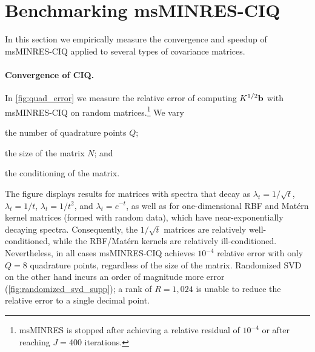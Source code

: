 
\section{Benchmarking msMINRES-CIQ}
\label{sec:ciq_empirical}

In this section we empirically measure the convergence and speedup of msMINRES-CIQ applied to several types of covariance matrices.

\paragraph{Convergence of CIQ.}
In \cref{fig:quad_error} we measure the relative error of computing $K^{1/2} \mathbf{b}$ with msMINRES-CIQ on random matrices.\footnote{
	msMINRES is stopped after achieving a relative residual of $10^{-4}$ or after reaching $J=400$ iterations.
}
We vary
%
\begin{enumerate*}
  \item the number of quadrature points $Q$;
  \item the size of the matrix $N$; and
  \item the conditioning of the matrix.
\end{enumerate*}
%
The figure displays results for matrices with spectra that decay as $\lambda_t = 1 / \sqrt{t}$, $\lambda_t = 1/t$, $\lambda_t = 1 / t^2$, and $\lambda_t = e^{-t}$,
as well as for one-dimensional RBF and Mat\'ern kernel matrices (formed with random data), which have near-exponentially decaying spectra.
Consequently, the $1 / \sqrt{t}$ matrices are relatively well-conditioned, while the RBF/Mat\'ern kernels are relatively ill-conditioned.
Nevertheless, in all cases msMINRES-CIQ achieves $10^{-4}$ relative error with only $Q=8$ quadrature points, regardless of the size of the matrix.
Randomized SVD on the other hand incurs an order of magnitude more error (\cref{fig:randomized_svd_supp}); a rank of $R=1,\!024$ is unable to reduce the relative error to a single decimal point.

